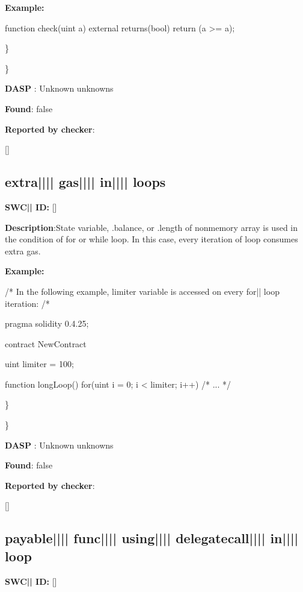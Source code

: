 \documentclass{article}
\begin{document}
\textbf{Example:} 
\begin{ffcode} 

function check(uint a) external returns(bool){
    return (a >= a);
}

\end{ffcode} 
\} 

\} 

\textbf{DASP} : Unknown unknowns

\textbf{Found}: false

\textbf{Reported by checker}: 
\begin{ffcode} 

[]
\end{ffcode} 
\subsection{extra{||\textunderscore|| }gas{||\textunderscore|| }in{||\textunderscore|| }loops} 
\textbf{SWC{|\textunderscore| }ID:} []

\textbf{Description}:State variable, .balance, or .length of non{\textendash}memory array is used in the condition of for or while loop. In this case, every iteration of loop consumes extra gas.


\textbf{Example:} 
\begin{ffcode} 

/* In the following example, limiter variable is accessed on every for|\textendash| loop iteration: /* 

pragma solidity 0.4.25;

contract NewContract {
    uint limiter = 100;

    function longLoop() {
        for(uint i = 0; i < limiter; i++) {
            /* ... */
        }
    }
}

\end{ffcode} 
\} 

\} 

\textbf{DASP} : Unknown unknowns

\textbf{Found}: false

\textbf{Reported by checker}: 
\begin{ffcode} 

[]
\end{ffcode} 
\subsection{payable{||\textunderscore|| }func{||\textunderscore|| }using{||\textunderscore|| }delegatecall{||\textunderscore|| }in{||\textunderscore|| }loop} 
\textbf{SWC{|\textunderscore| }ID:} []
\end{document}
